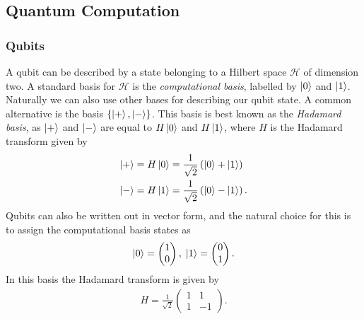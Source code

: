 \subsection{Quantum Computation}
\subsubsection{Qubits}
\label{subsubsection:qubits}
A qubit can be described by a state belonging to a Hilbert space $\mathcal{H}$ of dimension two.
A standard basis for $\mathcal{H}$ is the \emph{computational basis}, labelled by $\ket{0}$ and $\ket{1}$.
Naturally we can also use other bases for describing our qubit state. A common alternative is the basis $\{\ket{+}, \ket{-}\}$.
This basis is best known as the \emph{Hadamard basis}, as $\ket{+}$ and $\ket{-}$ are equal to $H\ket{0}$ and $H\ket{1}$, where $H$ is the Hadamard transform given by
\begin{align}
    \ket{+} &= H\ket{0} = \frac{1}{\sqrt2} \left(\ket{0} + \ket{1}\right)\\
    \ket{-} &= H\ket{1} = \frac{1}{\sqrt2} \left(\ket{0} - \ket{1}\right).
\end{align}
Qubits can also be written out in vector form, and the natural choice for this is to assign the computational basis states as
\begin{align}
    \ket{0} = 
    \begin{pmatrix}
        1 \\
        0
    \end{pmatrix}, \;
    \ket{1} = 
    \begin{pmatrix}
        0 \\
        1
    \end{pmatrix}.
\end{align}
In this basis the Hadamard transform is given by
\begin{align}
    H = \frac{1}{\sqrt{2}}
    \begin{pmatrix}
        1 & 1\\
        1 & -1
    \end{pmatrix}.
    \label{eqn:hadmard_matrix}
\end{align}

